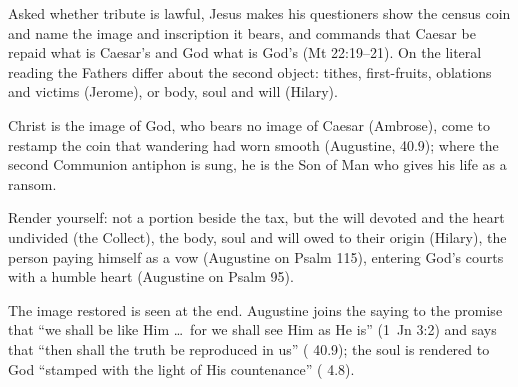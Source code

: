 \begin{fourSenses}
\item[Literal.] Asked whether tribute is lawful, Jesus makes his questioners
show the census coin and name the image and inscription it bears, and commands
that Caesar be repaid what is Caesar's and God what is God's (Mt 22:19--21).
On the literal reading the Fathers differ about the second object: tithes,
first-fruits, oblations and victims (Jerome), or body, soul and will
(Hilary).
\item[Allegorical.] Christ is the image of God, who bears no image of Caesar
(Ambrose), come to restamp the coin that wandering had worn smooth (Augustine,
 40.9); where the second Communion antiphon is sung, he is the
Son of Man who gives his life as a ransom.
\item[Moral.] Render yourself: not a portion beside the tax, but the will
devoted and the heart undivided (the Collect), the body, soul and will owed to
their origin (Hilary), the person paying himself as a vow (Augustine on
Psalm 115), entering God's courts with a humble heart (Augustine on
Psalm 95).
\item[Anagogical.] The image restored is seen at the end. Augustine joins the
saying to the promise that ``we shall be like Him \ldots\ for we shall see Him
as He is'' (1~Jn 3:2) and says that ``then shall the truth be reproduced in
us'' ( 40.9); the soul is rendered to God ``stamped with the
light of His countenance'' ( 4.8).
\end{fourSenses}
